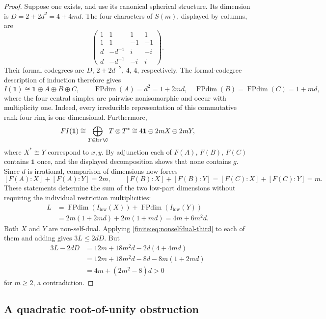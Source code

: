 \begin{proof}
Suppose one exists, and use its canonical spherical structure. Its dimension is
$D=2+2d^2=4+4md$. The four characters of $S(m)$, displayed by columns, are
\[
 \begin{pmatrix}
 1&1&1&1\\
 1&1&-1&-1\\
 d&-d^{-1}&i&-i\\
 d&-d^{-1}&-i&i
 \end{pmatrix}.
\]
Their formal codegrees are $D$, $2+2d^{-2}$, $4$, $4$, respectively.
The formal-codegree description of induction therefore gives
\[
 I(\mathbf1)\cong\mathbf1\oplus A\oplus B\oplus C,
 \qquad
 \operatorname{FPdim}(A)=d^2=1+2md,
 \quad
 \operatorname{FPdim}(B)=\operatorname{FPdim}(C)=1+md,
\]
where the four central simples are pairwise nonisomorphic and occur with
multiplicity one. Indeed, every irreducible representation of this commutative
rank-four ring is one-dimensional. Furthermore,
\[
 F I(\mathbf1)\cong
 \bigoplus_{T\in\operatorname{Irr}\C}T\otimes T^*
 \cong 4\mathbf1\oplus2mX\oplus2mY,
\]
where $X^*\cong Y$ correspond to $x,y$. By adjunction each of $F(A)$,
$F(B)$, $F(C)$ contains $\mathbf1$ once, and the displayed decomposition
shows that none contains $g$. Since $d$ is irrational, comparison of dimensions
now forces
\[
 [F(A):X]+[F(A):Y]=2m,\qquad
 [F(B):X]+[F(B):Y]=[F(C):X]+[F(C):Y]=m.
\]
These statements determine the sum of the two low-part dimensions without
requiring the individual restriction multiplicities:
\begin{align*}
 L&=\operatorname{FPdim}(I_{\mathrm{low}}(X))+
    \operatorname{FPdim}(I_{\mathrm{low}}(Y))\\
  &=2m(1+2md)+2m(1+md)=4m+6m^2d.
\end{align*}
Both $X$ and $Y$ are non-self-dual. Applying
\eqref{finite:eq:nonselfdual-third} to each of them and adding gives $3L\leq2dD$.
But
\begin{align*}
 3L-2dD
 &=12m+18m^2d-2d(4+4md)\\
 &=12m+18m^2d-8d-8m(1+2md)\\
 &=4m+(2m^2-8)d>0
\end{align*}
for $m\geq2$, a contradiction.
\end{proof}



\subsection{A quadratic root-of-unity obstruction}\label{finite:sec:quadratic-family}

